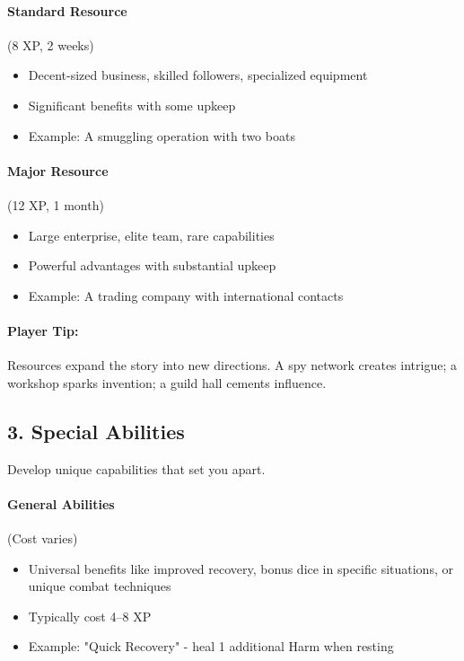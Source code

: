 \paragraph{Standard Resource} (8 XP, 2 weeks)
\begin{itemize}
\item Decent-sized business, skilled followers, specialized equipment
\item Significant benefits with some upkeep
\item Example: A smuggling operation with two boats
\end{itemize}

\paragraph{Major Resource} (12 XP, 1 month)
\begin{itemize}
\item Large enterprise, elite team, rare capabilities
\item Powerful advantages with substantial upkeep
\item Example: A trading company with international contacts
\end{itemize}

\paragraph{Player Tip:} Resources expand the story into new directions. A spy network creates intrigue; a workshop sparks invention; a guild hall cements influence.

\subsection*{3. Special Abilities}

Develop unique capabilities that set you apart.

\paragraph{General Abilities} (Cost varies) 
\begin{itemize}
\item Universal benefits like improved recovery, bonus dice in specific situations, or unique combat techniques
\item Typically cost 4–8 XP
\item Example: "Quick Recovery" - heal 1 additional Harm when resting
\end{itemize}

